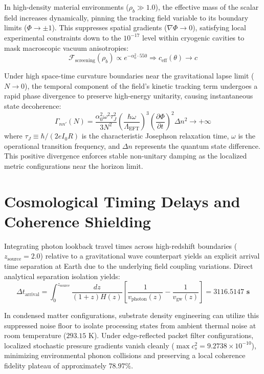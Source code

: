 \documentclass[11pt,a4paper]{article}
\begin{document}
	In high-density material environments ($\rho_b \gg 1.0$), the effective mass of the scalar field increases dynamically, pinning the tracking field variable to its boundary limits ($\Phi \rightarrow \pm 1$). This suppresses spatial gradients ($\nabla\Phi \rightarrow 0$), satisfying local experimental constraints down to the $10^{-17}$ level within cryogenic cavities to mask macroscopic vacuum anisotropies:
	\begin{equation}
		\mathcal{F}_{\text{screening}}(\rho_b) \propto e^{-\alpha_0^2 \cdot 550} \Longrightarrow c_{\text{eff}}(\theta) \longrightarrow c
	\end{equation}
	
	Under high space-time curvature boundaries near the gravitational lapse limit ($N \rightarrow 0$), the temporal component of the field's kinetic tracking term undergoes a rapid phase divergence to preserve high-energy unitarity, causing instantaneous state decoherence:
	\begin{equation}
		\Gamma_{nn'}(N) = \frac{\alpha_0^2 \omega^2 \tau_J^2}{3 N^2} \left( \frac{\hbar \omega}{\Lambda_{\text{EFT}}} \right)^3 \left( \frac{\partial \Phi}{\partial t} \right)^2 \Delta n^2 \longrightarrow +\infty
	\end{equation}
	where $\tau_J \equiv \hbar / (2e I_0 R)$ is the characteristic Josephson relaxation time, $\omega$ is the operational transition frequency, and $\Delta n$ represents the quantum state difference. This positive divergence enforces stable non-unitary damping as the localized metric configurations near the horizon limit.
	
	\section{Cosmological Timing Delays and Coherence Shielding}
	Integrating photon lookback travel times across high-redshift boundaries ($z_{\text{source}} = 2.0$) relative to a gravitational wave counterpart yields an explicit arrival time separation at Earth due to the underlying field coupling variations. Direct analytical separation isolation yields:
	\begin{equation}
		\Delta t_{\text{arrival}} = \int_{0}^{z_{\text{source}}} \frac{dz}{(1+z)H(z)} \left[ \frac{1}{v_{\text{photon}}(z)} - \frac{1}{v_{\text{gw}}(z)} \right] = \mathbf{3116.5147\text{ s}}
	\end{equation}
	
	In condensed matter configurations, substrate density engineering can utilize this suppressed noise floor to isolate processing states from ambient thermal noise at room temperature ($293.15\text{ K}$). Under edge-reflected packet filter configurations, localized stochastic pressure gradients vanish cleanly ($\max c_s^2 = 9.2738 \times 10^{-10}$), minimizing environmental phonon collisions and preserving a local coherence fidelity plateau of approximately $78.97\%$.
	
\end{document}
